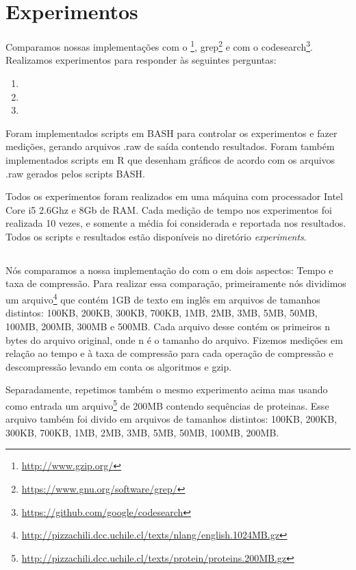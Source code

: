 \section{Experimentos}
Comparamos nossas implementações com o
\gzip\footnote{\url{http://www.gzip.org/}},
grep\footnote{\url{https://www.gnu.org/software/grep/}} e com o
codesearch\footnote{\url{https://github.com/google/codesearch}}.
Realizamos experimentos para responder às seguintes perguntas:
\begin{enumerate}
\item \rqone
\item \rqtwo
\item \rqthree
\end{enumerate}

Foram implementados scripts em BASH para controlar os experimentos e fazer
medições, gerando arquivos .raw de saída contendo resultados. Foram também
implementados scripts em R que desenham gráficos de acordo com os arquivos .raw
gerados pelos scripts BASH.


Todos os experimentos foram realizados em uma máquina com processador Intel Core
i5 2.6Ghz e 8Gb de RAM. Cada medição de tempo nos experimentos foi realizada 10
vezes, e somente a média foi considerada e reportada nos resultados.
Todos os scripts e resultados estão disponíveis no diretório {\it experiments}.

\subsection{\rqone}
Nós comparamos a nossa implementação do \lz com o \gzip em dois aspectos: Tempo
e taxa de compressão.
Para realizar essa comparação, primeiramente nós dividimos um arquivo\footnote{
\url{http://pizzachili.dcc.uchile.cl/texts/nlang/english.1024MB.gz}}
que contém 1GB de texto em inglês em arquivos de
tamanhos distintos: 100KB, 200KB, 300KB, 700KB, 1MB, 2MB, 3MB, 5MB, 50MB, 100MB,
200MB, 300MB e 500MB. Cada arquivo desse contém os primeiros n bytes do
arquivo original, onde n é o tamanho do arquivo. Fizemos medições em relação ao
tempo e à taxa de compressão para cada operação de compressão e descompressão
levando em conta os algoritmos \lz e gzip.

Separadamente, repetimos também o mesmo experimento acima mas
usando como entrada um arquivo\footnote{\url{http://pizzachili.dcc.uchile.cl/texts/protein/proteins.200MB.gz}}
de 200MB contendo sequências de proteinas. Esse arquivo também foi divido
em arquivos de tamanhos distintos: 100KB, 200KB, 300KB, 700KB, 1MB, 2MB, 3MB, 5MB,
50MB, 100MB, 200MB.

